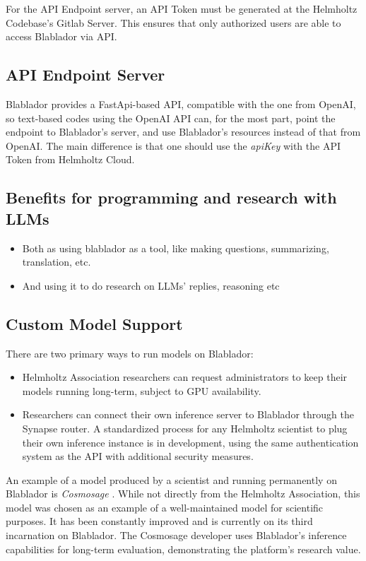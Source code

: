 \documentclass[10pt,conference]{IEEEtran}
\begin{document}
For the API Endpoint server, an API Token must be generated at the Helmholtz Codebase's Gitlab Server\cite{helmholtzcodebase}. This ensures that only authorized users are able to access Blablador via API.

\subsection{API Endpoint Server}
Blablador provides a FastApi-based \cite{FastAPI} API, compatible with the one from OpenAI, so text-based codes using the OpenAI API can, for the most part, point the endpoint to Blablador's server, and use Blablador's resources instead of that from OpenAI. The main difference is that one should use the \emph{apiKey} with the API Token from Helmholtz Cloud.

\subsection{Benefits for programming and research with LLMs}
\begin{itemize}
    \item Both as using blablador as a tool, like making questions, summarizing, translation, etc.
    \item And using it to do research on LLMs' replies, reasoning etc
\end{itemize}


\subsection{Custom Model Support}
There are two primary ways to run models on Blablador:
\begin{itemize}
    \item Helmholtz Association researchers can request administrators to keep their models running long-term, subject to GPU availability.
    \item Researchers can connect their own inference server to Blablador through the Synapse router. A standardized process for any Helmholtz scientist to plug their own inference instance is in development, using the same authentication system as the API with additional security measures.
\end{itemize}

An example of a model produced by a scientist and running permanently on Blablador is \emph{Cosmosage} \cite{dehaan2024cosmosage}. While not directly from the Helmholtz Association, this model was chosen as an example of a well-maintained model for scientific purposes. It has been constantly improved and is currently on its third incarnation on Blablador. The Cosmosage developer uses Blablador's inference capabilities for long-term evaluation, demonstrating the platform's research value.
\end{document}
